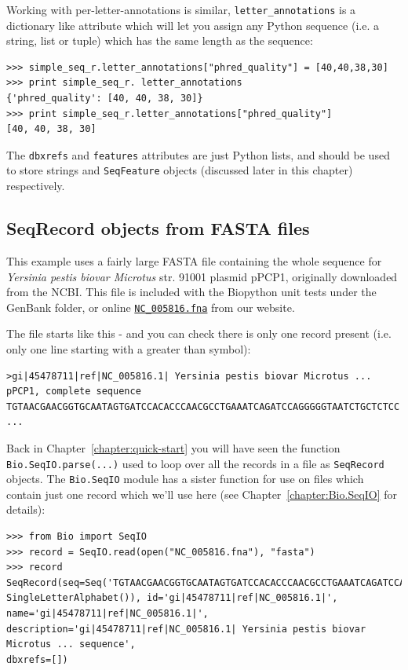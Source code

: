 \documentclass{report}
\begin{document}
Working with per-letter-annotations is similar, \verb|letter_annotations| is a
dictionary like attribute which will let you assign any Python sequence (i.e.
a string, list or tuple) which has the same length as the sequence:

\begin{verbatim}
>>> simple_seq_r.letter_annotations["phred_quality"] = [40,40,38,30]
>>> print simple_seq_r. letter_annotations
{'phred_quality': [40, 40, 38, 30]}
>>> print simple_seq_r.letter_annotations["phred_quality"]
[40, 40, 38, 30]
\end{verbatim}

The \verb|dbxrefs| and \verb|features| attributes are just Python lists, and
should be used to store strings and \verb|SeqFeature| objects (discussed later
in this chapter) respectively.


\subsection{SeqRecord objects from FASTA files}

This example uses a fairly large FASTA file containing the whole sequence for \textit{Yersinia pestis biovar Microtus} str. 91001 plasmid pPCP1, originally downloaded from the NCBI.  This file is included with the Biopython unit tests under the GenBank folder, or online \href{http://biopython.org/SRC/biopython/Tests/GenBank/NC_005816.fna}{\texttt{NC\_005816.fna}} from our website.

The file starts like this - and you can check there is only one record present (i.e. only one line starting with a greater than symbol):

\begin{verbatim}
>gi|45478711|ref|NC_005816.1| Yersinia pestis biovar Microtus ... pPCP1, complete sequence
TGTAACGAACGGTGCAATAGTGATCCACACCCAACGCCTGAAATCAGATCCAGGGGGTAATCTGCTCTCC
...
\end{verbatim}

Back in Chapter~\ref{chapter:quick-start} you will have seen the function \verb|Bio.SeqIO.parse(...)|
used to loop over all the records in a file as \verb|SeqRecord| objects. The \verb|Bio.SeqIO| module
has a sister function for use on files which contain just one record which we'll use here (see Chapter~\ref{chapter:Bio.SeqIO} for details):

\begin{verbatim}
>>> from Bio import SeqIO
>>> record = SeqIO.read(open("NC_005816.fna"), "fasta")
>>> record
SeqRecord(seq=Seq('TGTAACGAACGGTGCAATAGTGATCCACACCCAACGCCTGAAATCAGATCCAGG...CTG',
SingleLetterAlphabet()), id='gi|45478711|ref|NC_005816.1|', name='gi|45478711|ref|NC_005816.1|',
description='gi|45478711|ref|NC_005816.1| Yersinia pestis biovar Microtus ... sequence',
dbxrefs=[])
\end{verbatim}
\end{document}

